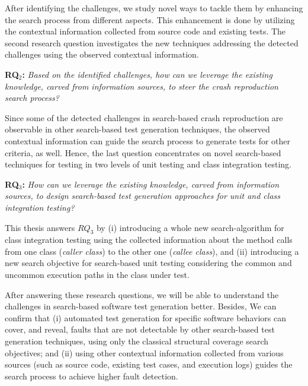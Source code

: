 After identifying the challenges, we study novel ways to tackle them by enhancing the search process from different aspects. This enhancement is done by utilizing the contextual information collected from source code and existing tests. The second research question investigates the new techniques addressing the detected challenges using the observed contextual information.


\begin{framed}
    
    \textbf{RQ$_2$: } \textit{Based on the identified challenges, how can we leverage the existing knowledge, carved from information sources, to steer the crash reproduction search process?}

\end{framed}

Since some of the detected challenges in search-based crash reproduction are observable in other search-based test generation techniques, the observed contextual information can guide the search process to generate tests for other criteria, as well. Hence, the last question concentrates on novel search-based techniques for testing in two levels of unit testing and class integration testing.

\begin{framed}
    \textbf{RQ$_3$: } \textit{How can we leverage the existing knowledge, carved from information sources, to design search-based test generation approaches for unit and class integration testing?}
\end{framed}

This thesis answers $RQ_3$ by (i) introducing a whole new search-algorithm for class integration testing using the collected information about the method calls from one class (\textit{caller class}) to the other one (\textit{callee class}), and (ii) introducing a new search objective for search-based unit testing considering the common and uncommon execution paths in the class under test.

After answering these research questions, we will be able to understand the challenges in search-based software test generation better. Besides, We can confirm that (i) automated test generation for specific software behaviors can cover, and reveal, faults that are not detectable by other search-based test generation techniques, using only the classical structural coverage search objectives; and (ii) using other contextual information collected from various sources (such as source code, existing test cases, and execution logs) guides the search process to achieve higher fault detection.





